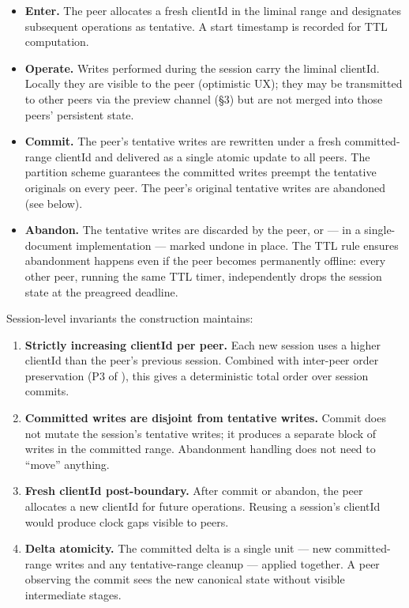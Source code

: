 \begin{itemize}
    \item \textbf{Enter.} The peer allocates a fresh clientId in the liminal range and designates subsequent operations as tentative. A start timestamp is recorded for TTL computation.
    \item \textbf{Operate.} Writes performed during the session carry the liminal clientId. Locally they are visible to the peer (optimistic UX); they may be transmitted to other peers via the preview channel (\S3) but are not merged into those peers' persistent state.
    \item \textbf{Commit.} The peer's tentative writes are rewritten under a fresh committed-range clientId and delivered as a single atomic update to all peers. The partition scheme guarantees the committed writes preempt the tentative originals on every peer. The peer's original tentative writes are abandoned (see below).
    \item \textbf{Abandon.} The tentative writes are discarded by the peer, or --- in a single-document implementation --- marked undone in place. The TTL rule ensures abandonment happens even if the peer becomes permanently offline: every other peer, running the same TTL timer, independently drops the session state at the preagreed deadline.
\end{itemize}

Session-level invariants the construction maintains:

\begin{enumerate}
    \item \textbf{Strictly increasing clientId per peer.} Each new session uses a higher clientId than the peer's previous session. Combined with inter-peer order preservation (P3 of \cite{plexus:partitioning}), this gives a deterministic total order over session commits.
    \item \textbf{Committed writes are disjoint from tentative writes.} Commit does not mutate the session's tentative writes; it produces a separate block of writes in the committed range. Abandonment handling does not need to ``move'' anything.
    \item \textbf{Fresh clientId post-boundary.} After commit or abandon, the peer allocates a new clientId for future operations. Reusing a session's clientId would produce clock gaps visible to peers.
    \item \textbf{Delta atomicity.} The committed delta is a single unit --- new committed-range writes and any tentative-range cleanup --- applied together. A peer observing the commit sees the new canonical state without visible intermediate stages.
\end{enumerate}

